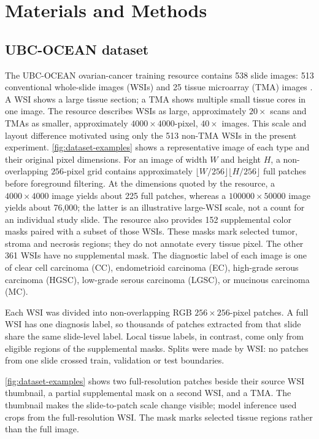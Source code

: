 \documentclass[conference,a4paper]{IEEEtran}
\begin{document}
\section{Materials and Methods}

\subsection{UBC-OCEAN dataset}

The UBC-OCEAN ovarian-cancer training resource contains 538 slide images:
513 conventional whole-slide images (WSIs) and 25 tissue microarray (TMA)
images \cite{ubc_ocean_2023}. A WSI shows a large tissue section; a TMA shows
multiple small tissue cores in one image. The resource describes WSIs as
large, approximately $20\times$ scans and TMAs as smaller, approximately
$4000\times4000$-pixel, $40\times$ images. This scale and layout difference
motivated using only the 513 non-TMA WSIs in the present experiment.
\autoref{fig:dataset-examples} shows a representative image of each type and their
original pixel dimensions.
For an image of width $W$ and height $H$, a non-overlapping $256$-pixel grid
contains approximately $\lfloor W/256\rfloor\lfloor H/256\rfloor$ full
patches before foreground filtering. At the dimensions quoted by the resource,
a $4000\times4000$ image yields about 225 full patches, whereas a
$100000\times50000$ image yields about 76,000; the latter is an illustrative
large-WSI scale, not a count for an individual study slide. The
resource also provides 152 supplemental color masks paired with a subset of
those WSIs. These masks mark selected tumor, stroma and necrosis regions;
they do not annotate every tissue pixel. The other 361 WSIs have no
supplemental mask. The diagnostic label of each image is one of clear cell
carcinoma (CC), endometrioid carcinoma (EC), high-grade serous carcinoma
(HGSC), low-grade serous carcinoma (LGSC), or mucinous carcinoma (MC).

Each WSI was divided into non-overlapping RGB $256\times256$-pixel patches.
A full WSI has one diagnosis label, so thousands of patches extracted from
that slide share the same slide-level label. Local tissue labels, in contrast,
come only from eligible regions of the supplemental masks. Splits were made
by WSI: no patches from one slide crossed train, validation or test
boundaries.

\autoref{fig:dataset-examples} shows two full-resolution patches beside their
source WSI thumbnail, a partial supplemental mask on a second WSI, and a TMA.
The thumbnail makes the slide-to-patch scale change visible; model inference
used crops from the full-resolution WSI. The mask marks selected tissue regions
rather than the full image.
\end{document}
